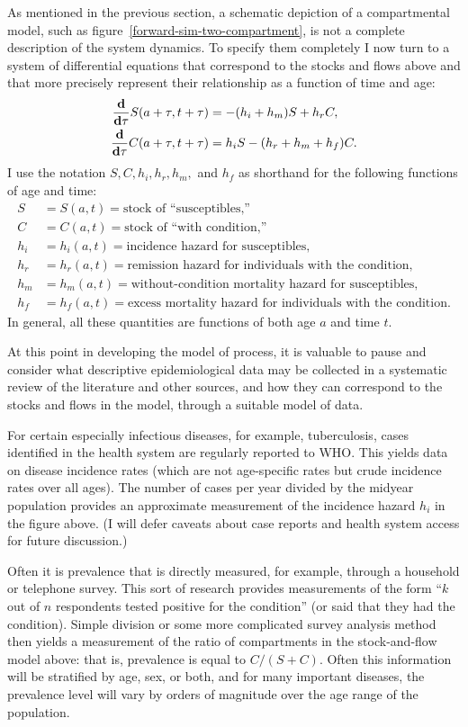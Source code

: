 As mentioned in the previous section, a schematic depiction of a
compartmental model, such as figure~\ref{forward-sim-two-compartment},
is not a complete description of the system dynamics.  To specify them
completely I now turn to a system of differential equations
that correspond to the stocks and flows above and that more precisely
represent their relationship as a function of time and age:
\begin{align*}
\frac{\mathbf{d} }{\mathbf{d} \tau} S(a+\tau,t+\tau) &= -(h_i + h_m)S + h_rC,\\
\frac{\mathbf{d}}{\mathbf{d} \tau} C(a+\tau,t+\tau) &= h_iS - (h_r + h_m + h_f)C.\\
\end{align*}
I use the notation $S,C,h_i,h_r,h_m,$ and $h_f$ as shorthand for the
following functions of age and time:
\begin{align*}
S &= S(a,t) = \text{stock of ``susceptibles,''}\\
C &= C(a,t) = \text{stock of ``with condition,''}\\[.1in]
h_i &= h_i(a,t) = \text{incidence hazard for susceptibles},\\
h_r &= h_r(a,t) = \text{remission hazard for individuals with the condition},\\
h_m &= h_m(a,t) = \text{without-condition mortality hazard for susceptibles},\\
h_f &= h_f(a,t) = \text{excess mortality hazard for individuals with the
condition}.
\end{align*}
In general, all these quantities are functions of both age $a$ and
time $t$.

At this point in developing the model of process, it is valuable to
pause and consider what descriptive epidemiological data may be
collected in a systematic review of the literature and other sources,
and how they can correspond to the stocks and flows in the model,
through a suitable model of data.

For certain especially infectious diseases, for example, tuberculosis, cases identified in the
health system are regularly reported to WHO.
This yields data on disease
incidence rates (which are not age-specific rates but crude incidence rates
over all ages).  The number of cases per
year divided by the midyear population provides an approximate
measurement of the incidence hazard $h_i$ in the figure above.
(I will defer caveats about case reports and health system
access for future discussion.)

Often it is prevalence that is directly measured, for example, through
a household or telephone survey.  This sort of research provides
measurements of the form ``$k$ out of $n$ respondents tested positive
for the condition'' (or said that they had the condition). Simple
division or some more complicated survey analysis method then yields a
measurement of the ratio of compartments in the stock-and-flow model
above: that is, prevalence is equal to $C/(S+C)$.  Often this
information will be stratified by age, sex, or both, and for many
important diseases, the prevalence level will vary by orders of
magnitude over the age range of the population.

